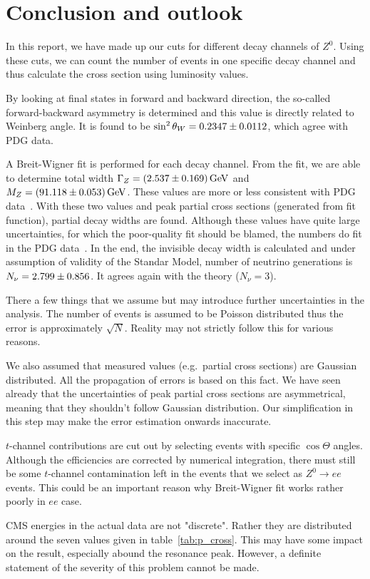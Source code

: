 \clearpage
\section{Conclusion and outlook}
In this report, we have made up our cuts for different decay channels of $Z^0$. Using these cuts, we can count the number of events in one specific decay channel and thus calculate the cross section using luminosity values. 

By looking at final states in forward and backward direction, the so-called forward-backward asymmetry is determined and this value is directly related to Weinberg angle. It is found to be $\sin^2\theta_W = \num{0.2347 +- 0.0112}$, which agree with PDG data.

A Breit-Wigner fit is performed for each decay channel. From the fit, we are able to determine total width $\Gamma_Z = \SI{2.537 +- 0.169}{\giga\eV}$ and $M_Z = \SI{91.118 +- 0.053}{\giga\eV}$. These values are more or less consistent with PDG data~\cite{PDG}. With these two values and peak partial cross sections (generated from fit function), partial decay widths are found. Although these values have quite large uncertainties, for which the poor-quality fit should be blamed, the numbers do fit in the PDG data~\cite{PDG}. In the end, the invisible decay width is calculated and under assumption of validity of the Standar Model, number of neutrino generations is $N_{\nu} = \num{2.799 +- 0.856}$. It agrees again with the theory ($N_\nu = 3$).

There a few things that we assume but may introduce further uncertainties in the analysis. The number of events is assumed to be Poisson distributed thus the error is approximately $\sqrt{N}$. Reality may not strictly follow this for various reasons.

We also assumed that measured values (e.g.~partial cross sections) are Gaussian distributed. All the propagation of errors is based on this fact. We have seen already that the uncertainties of peak partial cross sections are asymmetrical, meaning that they shouldn't follow Gaussian distribution. Our simplification in this step may make the error estimation onwards inaccurate.

$t$-channel contributions are cut out by selecting events with specific $\cos\Theta$ angles. Although the efficiencies are corrected by numerical integration, there must still be some $t$-channel contamination left in the events that we select as $Z^0 \rightarrow ee$ events. This could be an important reason why Breit-Wigner fit works rather poorly in $ee$ case.

CMS energies in the actual data are not "discrete". Rather they are distributed around the seven values given in table~\ref{tab:p_cross}. This may have some impact on the result, especially abound the resonance peak. However, a definite statement of the severity of this problem cannot be made.

